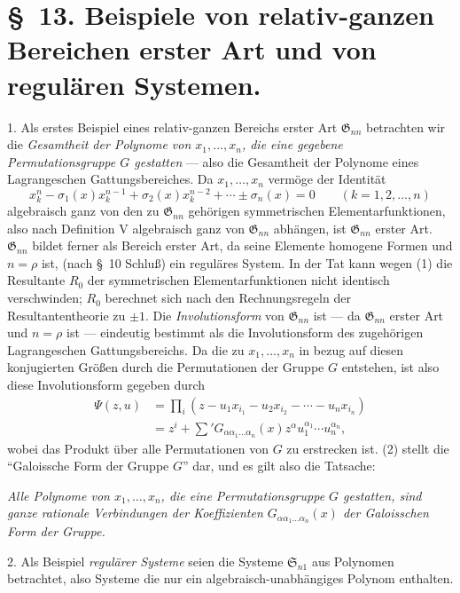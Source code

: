 \documentclass[11pt]{article}
\providecommand{\Ssys}{\mathfrak{S}}
\providecommand{\Gdom}{\mathfrak{G}}
\begin{document}
\section*{\S\ 13. Beispiele von relativ-ganzen Bereichen erster Art und von regulären Systemen.}

1. Als erstes Beispiel eines relativ-ganzen Bereichs erster Art $\Gdom_{nn}$ betrachten wir die \emph{Gesamtheit der Polynome von $x_1,
\ldots,x_n$, die eine gegebene Permutationsgruppe $G$ gestatten} --- also die Gesamtheit der Polynome eines Lagrangeschen Gattungsbereiches. Da $x_1,
\ldots,x_n$ vermöge der Identität
\begin{equation}
  x_k^n-\sigma_1(x)x_k^{n-1}+\sigma_2(x)x_k^{n-2}+\cdots\pm\sigma_n(x)=0
  \qquad(k=1,2,
\ldots,n)
\tag{1}
\end{equation}
algebraisch ganz von den zu $\Gdom_{nn}$ gehörigen symmetrischen Elementarfunktionen, also nach Definition V algebraisch ganz von $\Gdom_{nn}$ abhängen, ist $\Gdom_{nn}$ erster Art. $\Gdom_{nn}$ bildet ferner als Bereich erster Art, da seine Elemente homogene Formen und $n=\rho$ ist, (nach \S\ 10 Schluß) ein reguläres System. In der Tat kann wegen (1) die Resultante $R_0$ der symmetrischen Elementarfunktionen nicht identisch verschwinden; $R_0$ berechnet sich nach den Rechnungsregeln der Resultantentheorie zu $\pm1$. Die \emph{Involutionsform} von $\Gdom_{nn}$ ist --- da $\Gdom_{nn}$ erster Art und $n=\rho$ ist --- eindeutig bestimmt als die Involutionsform des zugehörigen Lagrangeschen Gattungsbereichs. Da die zu $x_1,
\ldots,x_n$ in bezug auf diesen konjugierten Größen durch die Permutationen der Gruppe $G$ entstehen, ist also diese Involutionsform gegeben durch
\begin{equation}
\begin{aligned}
  \Psi(z,u)&=\prod_i
  (z-u_1x_{i_1}-u_2x_{i_2}-\cdots-u_nx_{i_n})\\
  &=z^i+\sum{}'G_{\alpha\alpha_1\ldots\alpha_n}(x)
  z^\alpha u_1^{\alpha_1}\cdots u_n^{\alpha_n},
\end{aligned}
\tag{2}
\end{equation}
wobei das Produkt über alle Permutationen von $G$ zu erstrecken ist. (2) stellt die ``Galoissche Form der Gruppe $G$'' dar, und es gilt also die Tatsache:

\emph{Alle Polynome von $x_1,
\ldots,x_n$, die eine Permutationsgruppe $G$ gestatten, sind ganze rationale Verbindungen der Koeffizienten $G_{\alpha\alpha_1\ldots\alpha_n}(x)$ der Galoisschen Form der Gruppe.}

2. Als Beispiel \emph{regulärer Systeme} seien die Systeme $\Ssys_{n1}$ aus Polynomen betrachtet, also Systeme die nur ein algebraisch-unabhängiges Polynom enthalten.
\end{document}
